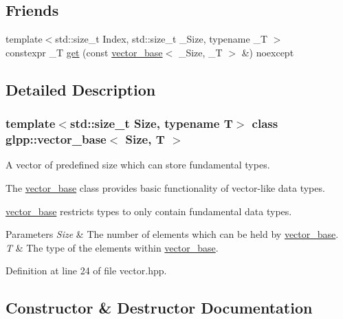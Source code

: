 \subsection*{Friends}
\begin{DoxyCompactItemize}
\item 
{\footnotesize template$<$std\+::size\+\_\+t Index, std\+::size\+\_\+t \+\_\+\+Size, typename \+\_\+T $>$ }\\constexpr \+\_\+T \hyperlink{classglpp_1_1vector__base_aaea1b1e4a7275fde6872c5c5395d11db}{get} (const \hyperlink{classglpp_1_1vector__base}{vector\+\_\+base}$<$ \+\_\+\+Size, \+\_\+T $>$ \&) noexcept
\end{DoxyCompactItemize}


\subsection{Detailed Description}
\subsubsection*{template$<$std\+::size\+\_\+t Size, typename T$>$\newline
class glpp\+::vector\+\_\+base$<$ Size, T $>$}

A vector of predefined size which can store fundamental types. 

The \hyperlink{classglpp_1_1vector__base}{vector\+\_\+base} class provides basic functionality of vector-\/like data types.

\hyperlink{classglpp_1_1vector__base}{vector\+\_\+base} restricts types to only contain fundamental data types. 


\begin{DoxyParams}{Parameters}
{\em Size} & The number of elements which can be held by \hyperlink{classglpp_1_1vector__base}{vector\+\_\+base}. \\
\hline
{\em T} & The type of the elements within \hyperlink{classglpp_1_1vector__base}{vector\+\_\+base}. \\
\hline
\end{DoxyParams}


Definition at line 24 of file vector.\+hpp.



\subsection{Constructor \& Destructor Documentation}
\mbox{\label{classglpp_1_1vector__base_a0345201763018059c125bdea2e98685d}} 
